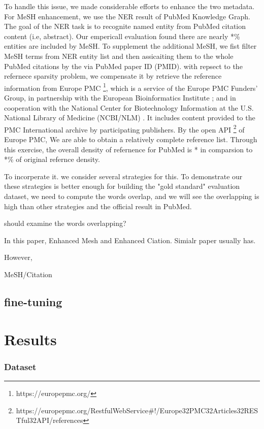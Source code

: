 \documentclass[11pt]{article}
\begin{document}
    To handle this issue, we made considerable efforts to enhance the two metadata. For MeSH enhancement, we use the NER result of PubMed Knowledge Graph\cite{xu2020building}. The goal of the NER task is to recognite named entity from PubMed citation content (i.e, abstract).
    Our empericall evaluation found there are nearly *\% entities are included by MeSH. To supplement the additional MeSH, we fist filter MeSH terms from NER entity list and then assicaiting them to the whole PubMed citations by the via PubMed paper ID (PMID).
    with repsect to the refernece sparsity problem, we compensate it by retrieve the reference information from Europe PMC \footnote{https://europepmc.org/}, which is a service of the Europe PMC Funders' Group, in partnership with the European Bioinformatics Institute ; and in cooperation with the National Center for Biotechnology Information at the U.S. National Library of Medicine (NCBI/NLM) . It includes content provided to the PMC International archive by participating publishers.
    By the open API \footnote{https://europepmc.org/RestfulWebService#!/Europe32PMC32Articles32RESTful32API/references} of Europe PMC, We are able to obtain a relatively complete reference list. Through this exercise, the overall density of refernence for PubMed is * in comparsion to *\% of original refernce density.

    To incorperate it. we consider several strategies for this.
    To demonstrate our these strategies is better enough for building the "gold standard" evaluation dataset, we need to compute the words overlap, and we will see the overlapping is high than other strategies and the official result in PubMed.

    should examine the words overlapping?

    In this paper,
    Enhanced Mesh and Enhanced Ciation. Simialr paper usually has.

    However,

    MeSH/Citation


    \subsection{fine-tuning}


    \section{Results}
    \subsubsection{Dataset}
\end{document}
